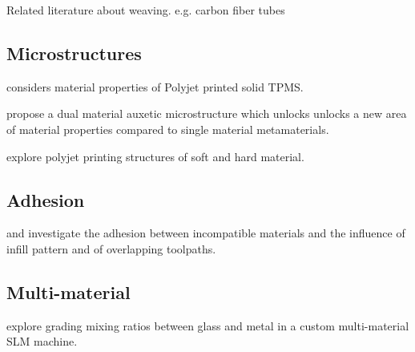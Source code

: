 Related literature about weaving. e.g. carbon fiber tubes


\subsection{Microstructures}

\cite{Afshar2016} considers material properties of Polyjet printed solid TPMS.

\cite{Wang2015} propose a dual material auxetic microstructure which unlocks unlocks a new area of material properties compared to single material metamaterials.


\cite{mirzaali2020} explore polyjet printing structures of soft and hard material. %

\subsection{Adhesion}

\cite{fernandez2019} and \citeauthor{tamburrino19} investigate the adhesion between incompatible materials and the influence of infill pattern and of overlapping toolpaths.

\subsection{Multi-material}
\cite{Zhang2020} explore grading mixing ratios between glass and metal in a custom multi-material SLM machine.

